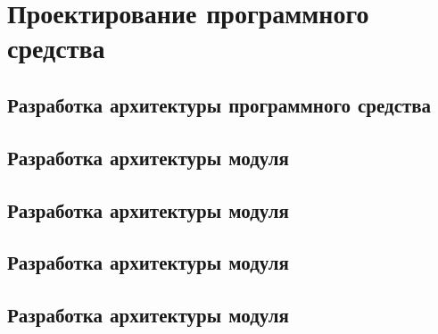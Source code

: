 \section{Проектирование программного средства}

\subsection{Разработка архитектуры программного средства}


\subsection{Разработка архитектуры модуля }


\subsection{Разработка архитектуры модуля }

\subsection{Разработка архитектуры модуля }

\subsection{Разработка архитектуры модуля }
